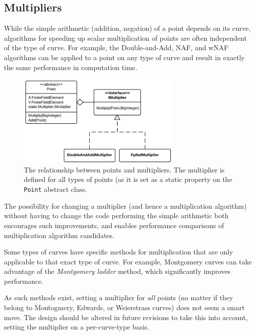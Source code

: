 \subsection{Multipliers}
\label{sec:implementation_multipliers}
\label{sec:implementation_multiplication}

While the simple arithmetic (addition, negation) of a point depends on its curve, algorithms for speeding up scalar
multiplication of points are often independent of the type of curve. For example, the Double-and-Add, NAF, and wNAF
algorithms can be applied to a point on any type of curve and result in exactly the same performance in computation
time.

\begin{figure}[htb]
	\centering
	\includegraphics[width=0.7\textwidth]{implementation/multipliers}
	\caption{The relationship between points and multipliers. The multiplier is defined for all types of points (as it
		is set as a static property on the \texttt{Point} abstract class.}
\end{figure}

The possibility for changing a multiplier (and hence a multiplication algorithm) without having to change the code
performing the simple arithmetic both encourages such improvements, and enables performance comparisons of multiplication
algorithm candidates.

Some types of curves have specific methods for multiplication that are only applicable to that exact type of curve. For
example, Montgomery curves can take advantage of the \emph{Montgomery ladder} method, which significantly improves
performance.\cite{safecurves}

As such methods exist, setting a multiplier for \emph{all} points (no matter if they belong to Montogmery, Edwards, or
Weierstrass curves) does not seem a smart move. The design should be altered in future revisions to take this into account,
setting the multiplier on a per-curve-type basis.